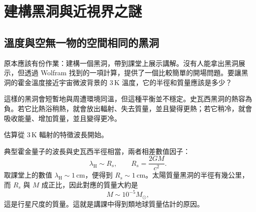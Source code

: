 \chapter{建構黑洞與近視界之謎}


\section{溫度與空無一物的空間相同的黑洞}

原本應該有份作業：建構一個黑洞，帶到課堂上展示講解。沒有人能拿出黑洞展示，但透過 Wolfram 找到的一項計算，提供了一個比較簡單的開場問題。要讓黑洞的霍金溫度接近宇宙微波背景的 \(3\,\mathrm{K}\) 溫度，它的半徑和質量應該是多少？

\begin{classroomqa}
\end{classroomqa}

這樣的黑洞會短暫地與周遭環境同溫，但這種平衡並不穩定。史瓦西黑洞的熱容為負。若它比熱浴稍熱，就會放出輻射、失去質量，並且變得更熱；若它稍冷，就會吸收能量、增加質量，並且變得更冷。

估算從 \(3\,\mathrm{K}\) 輻射的特徵波長開始。

\begin{classroomqa}
\end{classroomqa}

典型霍金量子的波長與史瓦西半徑相當，兩者相差數值因子：
\begin{equation}
\lambda_{\mathrm{H}}\sim R_s,
\qquad
R_s=\frac{2GM}{c^2}.
\label{eq:l05-scale}
\end{equation}
取課堂上的數值 \(\lambda_{\mathrm H}\sim1\,\mathrm{cm}\)，便得到 \(R_s\sim1\,\mathrm{cm}\)。太陽質量黑洞的半徑有幾公里，而 \(R_s\) 與 \(M\) 成正比，因此對應的質量大約是
\begin{equation}
M\sim10^{-5}M_\odot,
\label{eq:l05-rough-mass}
\end{equation}
這是行星尺度的質量。這就是講課中得到類地球質量估計的原因。

